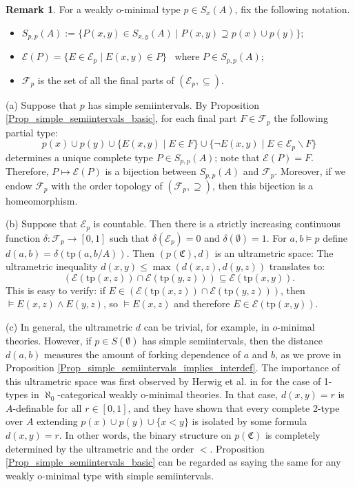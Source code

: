 \documentclass{amsart}
\theoremstyle{definition}
\theoremstyle{definition}
\newtheorem{Remark}[Theorem]{Remark}
\newcommand{\Mon}{\mathfrak C}
\newcommand{\tp}{\mathrm{tp}}
\begin{document}
\begin{Remark}\label{Remark ultrametric on p(Mon)}
For a weakly o-minimal type $p\in S_x(A)$, fix the following notation.
\begin{itemize}
    \item $S_{p,p}(A):=\{P(x,y)\in S_{x,y}(A)\mid P(x,y)\supseteq p(x)\cup p(y)\}$;
    \item $\mathcal E(P)=\{E\in\mathcal E_p\mid E(x,y)\in P\}$ \ where $P\in S_{p,p}(A)$;
    \item $\mathcal F_p$ is the set of all the final parts of $(\mathcal E_p,\subseteq)$.
\end{itemize}

(a) Suppose that $p$ has simple semiintervals. By Proposition \ref{Prop_simple_semiintervals_basic}, for each final part $F\in \mathcal F_p$ the following partial type:
\[p(x)\cup p(y)\cup \{ E(x,y)\mid  E\in F\}\cup \{\lnot E(x,y)\mid E\in\mathcal E_p\smallsetminus F\}\]
determines a unique complete type $P\in S_{p,p}(A)$; note that $\mathcal E(P)=F$. Therefore, $P\mapsto \mathcal E(P)$ is a bijection between $S_{p,p}(A)$ and $\mathcal F_p$. Moreover, if we endow $\mathcal F_p$ with the order topology of $(\mathcal F_p,\supseteq)$, then this bijection is a homeomorphism. 

(b) Suppose that $\mathcal E_p$ is countable. Then there is a strictly increasing continuous function $\delta:\mathcal F_p\to [0,1]$ such that $\delta(\mathcal E_p)=0$ and $\delta(\emptyset)=1$.  
For $a,b\models p$ define $d(a,b)=\delta(\tp(a,b/A))$. 
Then $(p(\Mon),d)$ is an ultrametric space: The ultrametric inequality $d(x,y)\leqslant \max(d(x,z),d(y,z))$ translates to:
\[\left(\mathcal E(\tp(x,z))\cap \mathcal E(\tp(y,z))\right)\subseteq \mathcal E(\tp(x,y)).\]
This is easy to verify: if $E\in (\mathcal E(\tp(x,z))\cap \mathcal E(\tp(y,z)))$, then $\models E(x,z)\land E(y,z)$, so $\models E(x,z)$ and therefore $E\in\mathcal E(\tp(x,y))$. 

(c) In general, the ultrametric $d$ can be trivial, for example,  in $o$-minimal theories. However, if $p\in S(\emptyset)$ has simple semiintervals, then the distance $d(a,b)$ measures the amount of forking dependence of $a$ and $b$, as we prove in Proposition  \ref{Prop_simple_semiintervals_implies_interdef}.
The importance of this ultrametric space was first observed by
Herwig et al. in \cite[Theorems 2.2-2.3]{Herwig} for the case of 1-types in $\aleph_0$-categorical weakly o-minimal theories. In that case, $d(x,y)=r$ is $A$-definable for all $r\in[0,1]$, and they have shown that every complete 2-type over $A$ extending $p(x)\cup p(y)\cup \{x<y\}$ is isolated by some formula $d(x,y)=r$. In other words, the binary structure on $p(\Mon)$ is completely determined by the ultrametric and the order $<$. Proposition \ref{Prop_simple_semiintervals_basic} can be regarded as saying the same for any weakly o-minimal type with simple semiintervals. 
\end{Remark}
\end{document}
